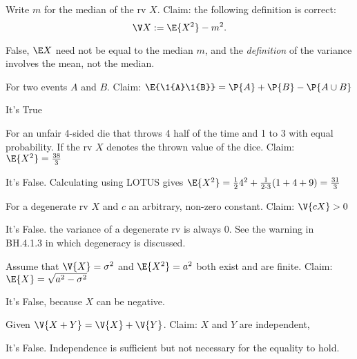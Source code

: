 \documentclass[tf-tutorial-all.tex]{subfiles}
\begin{document}
\begin{truefalse}
Write $m$ for the median of the rv $X$. Claim: the following definition is correct:
\begin{equation*}
\V X := \E{X^2} - m^{2}.
\end{equation*}
\begin{solution}
False, $\E X$ need not be equal to the median $m$, and  the \emph{definition} of the variance involves the mean, not the median.
\end{solution}
\end{truefalse}


\begin{truefalse}
    For two events $A$ and $B$. Claim: $\E{\1{A}\1{B}} = \P{A} + \P{B} - \P{A \cup B}$
\begin{solution}
It's True
\end{solution}
\end{truefalse}

\begin{truefalse}
For an unfair 4-sided die that throws 4 half of the time and 1 to 3 with equal probability.
If the rv
$X$ denotes the thrown value of the dice.
Claim: $\E{X^2} = \frac{38}{3}$
\begin{solution}
It's False. Calculating using LOTUS gives $\E{X^2} = \frac{1}{2} 4^{2} + \frac{1}{2\cdot3}(1 + 4 + 9) = \frac{31}{3}$
\end{solution}
\end{truefalse}

\begin{truefalse}
For a degenerate rv $X$ and $c$ an arbitrary, non-zero constant. Claim: $\V{cX} > 0$
\begin{solution}
It's False. the variance of a degenerate rv is always 0. See the warning in BH.4.1.3 in which degeneracy is discussed.
\end{solution}
\end{truefalse}

\begin{truefalse}
Assume that $\V{X} = \sigma^2$ and $\E{X^2} = a^2$ both exist and are finite. Claim:$ \E{X} = \sqrt{a^2-\sigma^2}$
\begin{solution}
It's False, because $X$ can be negative.
\end{solution}
\end{truefalse}

\begin{truefalse}
Given $\V{X+Y} = \V{X} + \V{Y}$. Claim: $X$ and $Y$ are independent,
\begin{solution}
It's False. Independence is sufficient but not necessary for the equality to hold.
\end{solution}
\end{truefalse}
\end{document}
